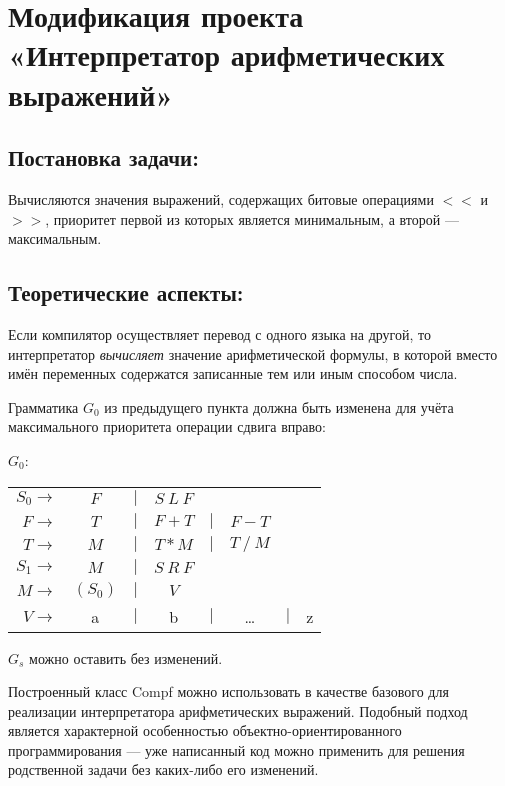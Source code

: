 \section{Модификация проекта «Интерпретатор арифметических выражений»}

\subsection{Постановка задачи:}
Вычисляются значения выражений, содержащих битовые операциями  $<<$ и $>>$,
приоритет первой из которых является минимальным, а второй — максимальным.

\subsection{Теоретические аспекты:}
Если компилятор осуществляет перевод с одного языка на другой, то интерпретатор
\emph{вычисляет} значение арифметической формулы, в которой вместо имён переменных
содержатся записанные тем или иным способом числа.

Грамматика $G_0$ из предыдущего пункта должна быть изменена для учёта максимального приоритета операции сдвига вправо:

$G_0$:
\medskip
\noindent\hspace{2cm}
\begin{tabular}{rcccccll}
$S_0 \rightarrow$ & $F $&$\mid$&$ S~L~F$\\
$F \rightarrow$ & $T $&$\mid$&$ F+T$&$\mid$&$ F-T$\\
$T \rightarrow$ & $M $&$\mid$&$ T*M$&$\mid$&$ T~/~M$\\
$S_1 \rightarrow$ & $M $&$\mid$&$ S~R~F$\\
$M \rightarrow$ & $(S_0)$&$\mid$&$ V$\\
$V \rightarrow$ & a &$\mid$& b &$\mid$& \dots &$\mid$& z\\
\end{tabular}
\medskip


$G_s$ можно оставить без изменений.

Построенный класс Compf можно использовать в качестве базового для реализации
интерпретатора арифметических выражений. Подобный подход является характерной
особенностью объектно-ориентированного программирования — уже написанный код можно
применить для решения родственной задачи без каких-либо его изменений.

